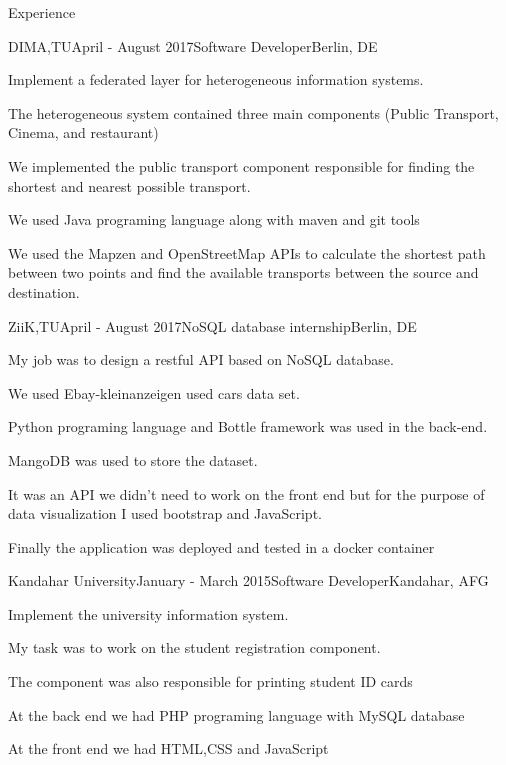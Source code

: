 \documentclass{resume} %
\begin{document}
\begin{rSection}{Experience}
\begin{rSubsection}{DIMA,TU}{April  - August 2017}{Software  Developer}{Berlin, DE}
\item Implement a federated layer for heterogeneous information systems.
\item The heterogeneous system contained three main components (Public Transport, Cinema, and restaurant)
\item We implemented the public transport component responsible for finding the shortest and nearest possible transport.
\item We used Java programing language along with maven and git tools
\item We used the Mapzen and OpenStreetMap APIs to calculate the shortest path between two points and find the available transports between the source and destination.
\end{rSubsection}





\begin{rSubsection}{ZiiK,TU}{April  - August 2017}{NoSQL database internship}{Berlin, DE}
\item My job was to design a restful API based on NoSQL database.
\item We used Ebay-kleinanzeigen used cars data set.
\item Python programing language and Bottle framework was used in the back-end.
\item MangoDB was used to store the dataset.
\item It was an API we didn't need to work on the front end but for the purpose of data visualization I used bootstrap and JavaScript.
\item Finally the application was deployed and tested in a docker container
\end{rSubsection}



\begin{rSubsection}{Kandahar University}{January - March 2015}{Software Developer}{Kandahar, AFG}
\item Implement the university information system.
\item My task was to work on the student registration component.
\item The component was also responsible for printing student ID cards
\item At the back end we had PHP programing language with MySQL database
\item At the front end we had HTML,CSS and JavaScript
\end{rSubsection}


\end{rSection}
\end{document}
